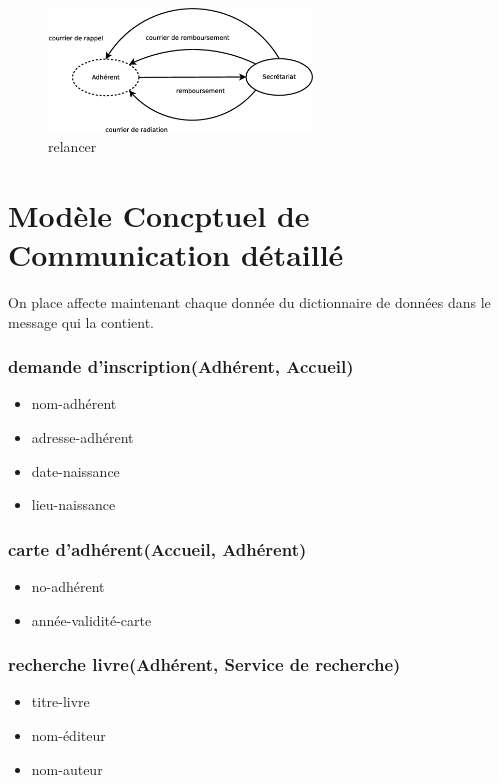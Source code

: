 \begin{figure}[!htb]
    \begin{center}
    \includegraphics[width=7cm]{images/cc1_mcc4.eps}
    \caption{\label{cc1_mcc4} relancer}
    \end{center}
\end{figure}

\newpage
\section*{Modèle Concptuel de Communication détaillé}

On place affecte maintenant chaque donnée du dictionnaire de données dans le message qui la contient.

\subsubsection*{demande d'inscription(Adhérent, Accueil)}
\begin{itemize}
    \item nom-adhérent
    \item adresse-adhérent
    \item date-naissance
    \item lieu-naissance
\end{itemize}

\subsubsection*{carte d'adhérent(Accueil, Adhérent)}
\begin{itemize}
    \item no-adhérent
    \item année-validité-carte
\end{itemize}

\subsubsection*{recherche livre(Adhérent, Service de recherche)}
\begin{itemize}
    \item titre-livre
    \item nom-éditeur
    \item nom-auteur
\end{itemize}

